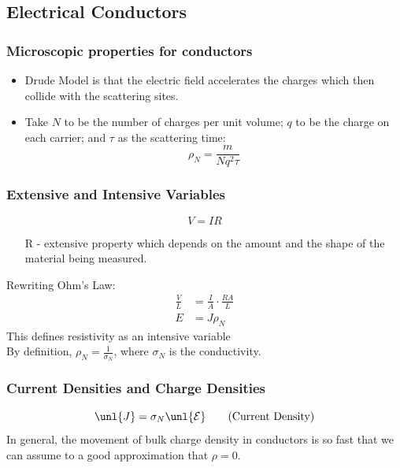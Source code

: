 \documentclass[a4paper, 11pt, normalem]{report}
\newcommand\E{\mathcal{E}}
\newcommand\uE{\unl{\E}}
\newcommand\J{\unl{J}}
\begin{document}
\subsection{Electrical Conductors}
\subsubsection{Microscopic properties for conductors}
\begin{itemize}
    \item Drude Model is that the electric field accelerates the charges which then collide with the scattering sites.
    \item Take $N$ to be the number of charges per unit volume; $q$ to be the charge on each carrier; and $\tau$ as the scattering time:
    \begin{equation}
        \rho_N = \frac{m}{Nq^2\tau}
    \end{equation}
\end{itemize}

\subsubsection{Extensive and Intensive Variables}
\begin{equation}
    V = IR \tag{Ohm's Law}
\end{equation}
\begin{itemize}
    \item[R] - extensive property which depends on the amount and the shape of the material being measured.
\end{itemize}
Rewriting Ohm's Law:
\begin{align}
    \frac{V}{L} &= \frac{I}{A} \cdot \frac{RA}{L} \\
    E &= J \rho_N
\end{align}
This defines resistivity as an intensive variable \\
By definition, $\rho_N = \frac{1}{\sigma_N}$, where $\sigma_N$ is the conductivity.

\subsubsection{Current Densities and Charge Densities}
\begin{equation}
    \J = \sigma_N \uE \tag{Current Density}
\end{equation}
In general, the movement of bulk charge density in conductors is so fast that we can assume to a good approximation that $\rho = 0.$
\end{document}
